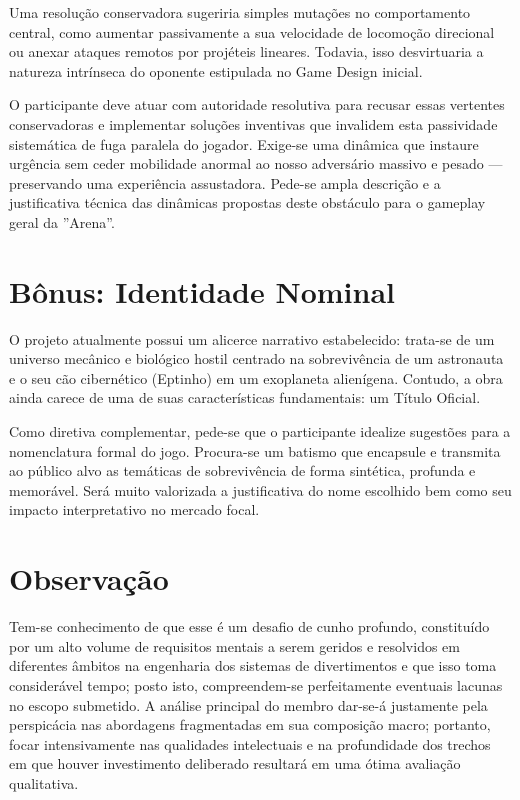 \documentclass[a4paper, 12pt,  oneside,a4paper,english,french,spanish,brazil]{book}     %
\begin{document}
Uma resolução conservadora sugeriria simples mutações no comportamento central, como aumentar passivamente a sua velocidade de locomoção direcional ou anexar ataques remotos por projéteis lineares. Todavia, isso desvirtuaria a natureza intrínseca do oponente estipulada no Game Design inicial.

O participante deve atuar com autoridade resolutiva para recusar essas vertentes conservadoras e implementar soluções inventivas que invalidem esta passividade sistemática de fuga paralela do jogador. Exige-se uma dinâmica que instaure urgência sem ceder mobilidade anormal ao nosso adversário massivo e pesado — preservando uma experiência assustadora. Pede-se ampla descrição e a justificativa técnica das dinâmicas propostas deste obstáculo para o gameplay geral da ''Arena''.

\section*{Bônus: Identidade Nominal}

O projeto atualmente possui um alicerce narrativo estabelecido: trata-se de um universo mecânico e biológico hostil centrado na sobrevivência de um astronauta e o seu cão cibernético (Eptinho) em um exoplaneta alienígena. Contudo, a obra ainda carece de uma de suas características fundamentais: um Título Oficial.

Como diretiva complementar, pede-se que o participante idealize sugestões para a nomenclatura formal do jogo. Procura-se um batismo que encapsule e transmita ao público alvo as temáticas de sobrevivência de forma sintética, profunda e memorável. Será muito valorizada a justificativa do nome escolhido bem como seu impacto interpretativo no mercado focal.

\newpage

\setcounter{page}{2}

\begin{center}
\end{center}

\vspace{0.5cm}

\section*{Observação}

Tem-se conhecimento de que esse é um desafio de cunho profundo, constituído por um alto volume de requisitos mentais a serem geridos e resolvidos em diferentes âmbitos na engenharia dos sistemas de divertimentos e que isso toma considerável tempo; posto isto, compreendem-se perfeitamente eventuais lacunas no escopo submetido. A análise principal do membro dar-se-á justamente pela perspicácia nas abordagens fragmentadas em sua composição macro; portanto, focar intensivamente nas qualidades intelectuais e na profundidade dos trechos em que houver investimento deliberado resultará em uma ótima avaliação qualitativa.
\end{document}

